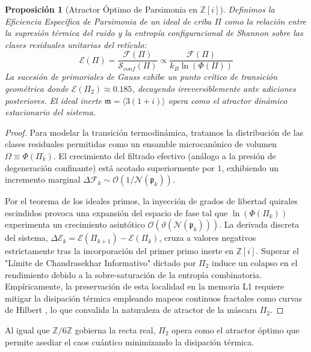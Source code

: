 \documentclass[12pt, a4paper]{article}
\theoremstyle{plain}
\newtheorem{proposicion}[teorema]{Proposición}
\theoremstyle{definition}
\theoremstyle{remark}
\newcommand{\Z}{\mathbb{Z}}
\newcommand{\Norm}{\mathcal{N}}
\begin{document}
\begin{proposicion}[Atractor Óptimo de Parsimonia en \texorpdfstring{$\Z[i]$}{Z[i]}]
\label{prop:atractor_gauss}
Definimos la \textit{Eficiencia Específica de Parsimonia} de un ideal de criba $\Pi$ como la relación entre la supresión térmica del ruido y la entropía configuracional de Shannon sobre las clases residuales unitarias del retículo:
\begin{equation}
    \mathcal{E}(\Pi) = \frac{\mathcal{F}(\Pi)}{\mathcal{S}_{conf}(\Pi)} \propto \frac{\mathcal{F}(\Pi)}{k_B \ln(\Phi(\Pi))}
\end{equation}
La sucesión de primoriales de Gauss exhibe un punto crítico de transición geométrica donde $\mathcal{E}(\Pi_2) \approx 0.185$, decayendo irreversiblemente ante adiciones posteriores. El ideal inerte $\mathfrak{m} = \langle 3(1+i) \rangle$ opera como el atractor dinámico estacionario del sistema.
\end{proposicion}

\begin{proof}
Para modelar la transición termodinámica, tratamos la distribución de las clases residuales permitidas como un ensamble microcanónico de volumen $\Omega \equiv \Phi(\Pi_k)$. El crecimiento del filtrado efectivo (análogo a la presión de degeneración confinante) está acotado superiormente por $1$, exhibiendo un incremento marginal $\Delta\mathcal{F}_k \sim \mathcal{O}(1/\Norm(\mathfrak{p}_k))$.

Por el teorema de los ideales primos, la inyección de grados de libertad quirales escindidos provoca una expansión del espacio de fase tal que $\ln(\Phi(\Pi_k))$ experimenta un crecimiento asintótico $\mathcal{O}(\vartheta(\Norm(\mathfrak{p}_k)))$. La derivada discreta del sistema, $\Delta\mathcal{E}_k = \mathcal{E}(\Pi_{k+1}) - \mathcal{E}(\Pi_k)$, cruza a valores negativos estrictamente tras la incorporación del primer primo inerte en $\Z[i]$. Superar el "Límite de Chandrasekhar Informativo" dictado por $\Pi_2$ induce un colapso en el rendimiento debido a la sobre-saturación de la entropía combinatoria. Empíricamente, la preservación de esta localidad en la memoria L1 requiere mitigar la disipación térmica empleando mapeos continuos fractales como curvas de Hilbert \cite{Bohm2021}, lo que convalida la naturaleza de atractor de la máscara $\Pi_2$.
\end{proof}

Al igual que $\Z/6\Z$ gobierna la recta real, $\Pi_2$ opera como el atractor óptimo que permite asediar el caos cuántico minimizando la disipación térmica.
\end{document}
